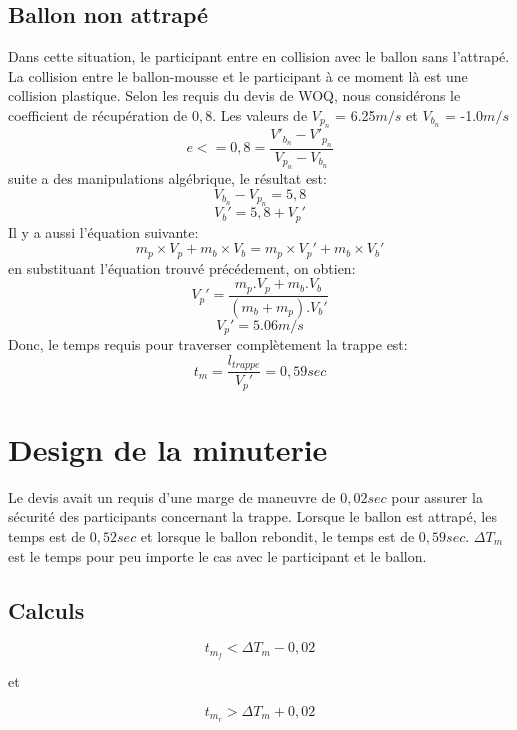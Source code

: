 \documentclass[12pt]{article}
\begin{document}
\subsection{Ballon non attrapé}
Dans cette situation, le participant entre en collision avec le ballon sans l'attrapé. La collision entre le ballon-mousse et le participant à ce moment là est une collision plastique. Selon les requis du devis de WOQ, nous considérons le coefficient de récupération de $0,8$. Les valeurs de $V_{p_n}$ = 6.25$m/s$ et $V_{b_n}$ = -1.0$m/s$
\begin{equation}
e <= 0,8 = \frac{V'_{b_n} - V'_{p_n}}{V_{p_n} - V_{b_n}}
\end{equation}
suite a des manipulations algébrique, le résultat est:
\begin{equation}
{V_{b_n} - V_{p_n}} = 5,8
\end{equation}
\begin{equation}
V_b' = 5,8 + V_p'
\end{equation}
Il y a aussi l'équation suivante:
\begin{equation}
m_p\times V_p + m_b\times V_b = m_p\times V_p' + m_b\times V_b'
\end{equation}
\noindent
en substituant l'équation trouvé précédement, on obtien:
\begin{equation}
V_p' = \frac{m_p.V_p + m_b.V_b}{(m_b + m_p).V_b'}
\end{equation}
\begin{equation}
V_p' = 5.06m/s
\end{equation}
Donc, le temps requis pour traverser complètement la trappe est:
\begin{equation}
t_m = \frac{l_{trappe}}{V_p'} = 0,59 sec
\end{equation}

\section{Design de la minuterie}
Le devis avait un requis d'une marge de maneuvre de $0,02sec$ pour assurer la sécurité des participants concernant la trappe. Lorsque le ballon est attrapé, les temps est de $0,52sec$ et lorsque le ballon rebondit, le temps est de $0,59sec$. $\Delta T_m$ est le temps pour peu importe le cas avec le participant et le ballon.
\subsection{Calculs}
\begin{equation}
t_{m_f} < \Delta T_m - 0,02
\end{equation}
\begin{center}
et
\end{center}
\begin{equation}
t_{m_r} > \Delta T_m + 0,02
\end{equation}
\end{document}
